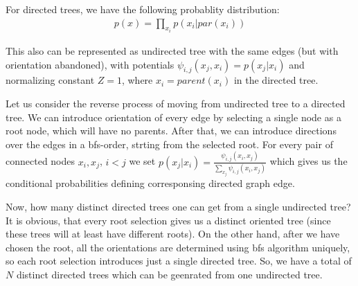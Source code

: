 \documentclass[fleqn]{article}
\begin{document}
For directed trees, we have the following probablity distribution:
\begin{align}
	p(x) = \prod\limits_{x_i} p(x_i | par(x_i))
\end{align}

This also can be represented as undirected tree with the same edges (but with orientation abandoned), with potentials $\psi_{i,j}(x_j, x_i) = p(x_j | x_i)$ and normalizing constant $Z = 1$, where $x_i = parent(x_i)$ in the directed tree.

Let us consider the reverse process of moving from undirected tree to a directed tree. We can introduce orientation of every edge by selecting a single node as a root node, which will have no parents. After that, we can introduce directions over the edges in a bfs-order, strting from the selected root. For every pair of connected nodes $x_i, x_j$, $i < j$ we set $p(x_j | x_i) = \frac{\psi_{i,j}(x_i, x_j)}{\sum\limits_{x_j}\psi_{i,j}(x_i, x_j)}$
which gives us the conditional probabilities defining corresponsing directed graph edge.


Now, how many distinct directed trees one can get from a single undirected tree? It is obvious, that every root selection gives us a distinct oriented tree (since these trees will at least have different roots). On the other hand, after we have chosen the root, all the orientations are determined using bfs algorithm uniquely, so each root selection introduces just a single directed tree. So, we have a total of $N$ distinct directed trees which can be geenrated from one undirected tree.
\end{document}
